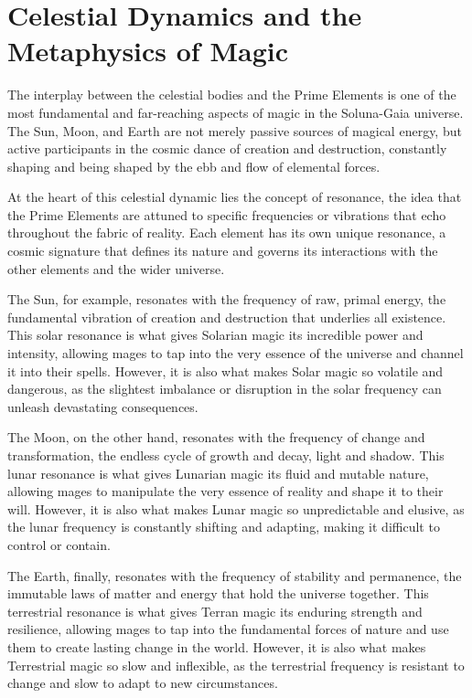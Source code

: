 \documentclass[12pt]{article}
\begin{document}
\section{Celestial Dynamics and the Metaphysics of Magic}

The interplay between the celestial bodies and the Prime Elements is one of the most fundamental and far-reaching aspects of magic in the Soluna-Gaia universe. The Sun, Moon, and Earth are not merely passive sources of magical energy, but active participants in the cosmic dance of creation and destruction, constantly shaping and being shaped by the ebb and flow of elemental forces.

At the heart of this celestial dynamic lies the concept of resonance, the idea that the Prime Elements are attuned to specific frequencies or vibrations that echo throughout the fabric of reality. Each element has its own unique resonance, a cosmic signature that defines its nature and governs its interactions with the other elements and the wider universe.

The Sun, for example, resonates with the frequency of raw, primal energy, the fundamental vibration of creation and destruction that underlies all existence. This solar resonance is what gives Solarian magic its incredible power and intensity, allowing mages to tap into the very essence of the universe and channel it into their spells. However, it is also what makes Solar magic so volatile and dangerous, as the slightest imbalance or disruption in the solar frequency can unleash devastating consequences.

The Moon, on the other hand, resonates with the frequency of change and transformation, the endless cycle of growth and decay, light and shadow. This lunar resonance is what gives Lunarian magic its fluid and mutable nature, allowing mages to manipulate the very essence of reality and shape it to their will. However, it is also what makes Lunar magic so unpredictable and elusive, as the lunar frequency is constantly shifting and adapting, making it difficult to control or contain.

The Earth, finally, resonates with the frequency of stability and permanence, the immutable laws of matter and energy that hold the universe together. This terrestrial resonance is what gives Terran magic its enduring strength and resilience, allowing mages to tap into the fundamental forces of nature and use them to create lasting change in the world. However, it is also what makes Terrestrial magic so slow and inflexible, as the terrestrial frequency is resistant to change and slow to adapt to new circumstances.
\end{document}
